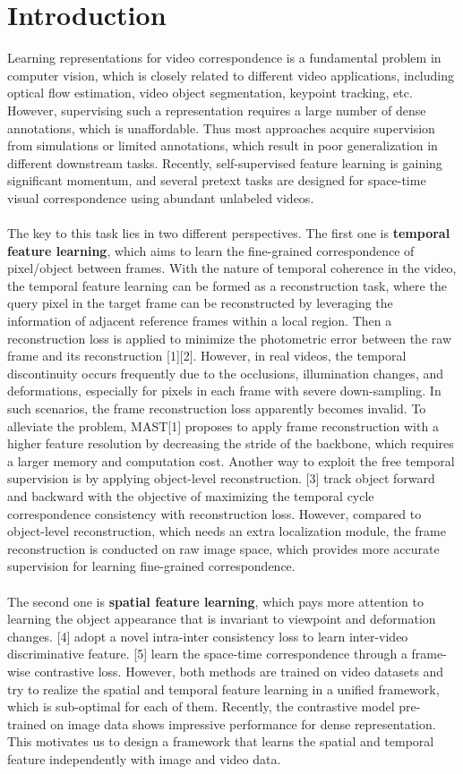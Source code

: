 \documentclass{article}
\begin{document}
\section{Introduction}
Learning representations for video correspondence is a fundamental problem in computer vision, which is closely related to different video applications, including optical flow estimation, video object segmentation, keypoint tracking, etc. However, supervising such a representation requires a large number of dense annotations, which is unaffordable. Thus most approaches acquire supervision from simulations or limited annotations, which result in poor generalization in different downstream tasks. Recently, self-supervised feature learning is gaining significant momentum, and several pretext tasks are designed for space-time visual correspondence using abundant unlabeled videos. \\
\\
The key to this task lies in two different perspectives. The first one is \textbf{temporal feature learning}, which aims to learn the fine-grained correspondence of pixel/object between frames. With the nature of temporal coherence in the video, the temporal feature learning can be formed as a reconstruction task, where the query pixel in the target frame can be reconstructed by leveraging the information of adjacent reference frames within a local region. Then a reconstruction loss is applied to minimize the photometric error between the raw frame and its reconstruction [1][2]. However, in real videos, the temporal discontinuity occurs frequently due to the occlusions, illumination changes, and deformations, especially for pixels in each frame with severe down-sampling. In such scenarios, the frame reconstruction loss apparently becomes invalid. To alleviate the problem, MAST[1] proposes to apply frame reconstruction with a higher feature resolution by decreasing the stride of the backbone, which requires a larger memory and computation cost. Another way to exploit the free temporal supervision is by applying object-level reconstruction. [3] track object forward and backward with the objective of maximizing the temporal cycle correspondence consistency with reconstruction loss. However, compared to object-level reconstruction, which needs an extra localization module, the frame reconstruction is conducted on raw image space, which provides more accurate supervision for learning fine-grained correspondence.\\
\\
The second one is \textbf{spatial feature learning}, which pays more attention to learning the object appearance that is invariant to viewpoint and deformation changes. [4] adopt a novel intra-inter consistency loss to learn inter-video discriminative feature. [5] learn the space-time correspondence through a frame-wise contrastive loss. However, both methods are trained on video datasets and try to realize the spatial and temporal feature learning in a unified framework, which is sub-optimal for each of them. Recently, the contrastive model pre-trained on image data shows impressive performance for dense representation. This motivates us to design a framework that learns the spatial and temporal feature independently with image and video data.  \\
\end{document}
